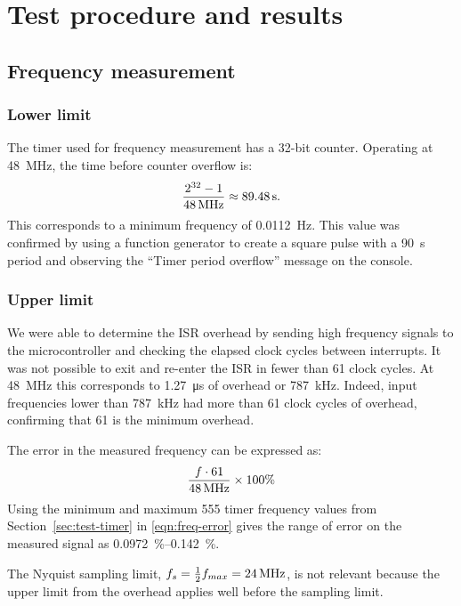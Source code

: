 \section{Test procedure and results}\label{sec:tests}
\subsection{Frequency measurement}\label{sec:test-freq}
\subsubsection{Lower limit}
The timer used for frequency measurement has a 32-bit counter.
Operating at \SI{48}{\mega\hertz}, the time before counter overflow is:
\begin{align*}
  {2^{32} -1 \over \SI{48}{\mega\hertz}} \approx \SI{89.48}{\second}.
\end{align*}
This corresponds to a minimum frequency of \SI{0.0112}{\hertz}.
This value was confirmed by using a function generator to create a square pulse with a \SI{90}{\second} period and observing the ``Timer period overflow'' message on the console.

\subsubsection{Upper limit}
We were able to determine the ISR overhead by sending high frequency signals to the microcontroller and checking the elapsed clock cycles between interrupts.
It was not possible to exit and re-enter the ISR in fewer than 61 clock cycles.
At \SI{48}{\mega\hertz} this corresponds to \SI{1.27}{\micro\second} of overhead or \SI{787}{\kilo\hertz}.
Indeed, input frequencies lower than \SI{787}{\kilo\hertz} had more than 61 clock cycles of overhead, confirming that 61 is the minimum overhead.

The error in the measured frequency can be expressed as:
\begin{align}\label{eqn:freq-error}
  {f \cdot 61 \over \SI{48}{\mega\hertz}} \times 100 \%
\end{align}
Using the minimum and maximum 555 timer frequency values from Section~\ref{sec:test-timer} in \eqref{eqn:freq-error} gives the range of error on the measured signal as \SIrange{0.0972}{0.142}{\percent}.

The Nyquist sampling limit, $f_s = {1 \over 2} f_{max} = \SI{24}{\mega\hertz}$, is not relevant because the upper limit from the overhead applies well before the sampling limit.

